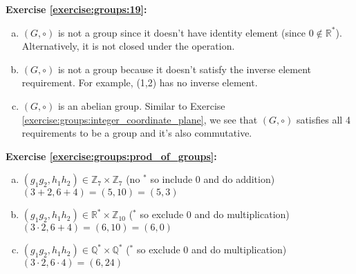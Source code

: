 \noindent\textbf{Exercise \ref{exercise:groups:19}:}
\begin{enumerate}[(a)]
\item
$(G, \circ)$ is not a group since it doesn't have identity element (since $ 0 \notin {\mathbb R}^*$). Alternatively, it is not closed under the operation.

\item
$(G, \circ)$ is not a group because it doesn't satisfy the inverse element requirement. For example, (1,2) has no inverse element.

\item
$(G, \circ)$ is an abelian group. Similar to Exercise \ref{exercise:groups:integer_coordinate_plane}, we see that $(G, \circ)$ satisfies all 4 requirements to be a group and it's also commutative.
\end{enumerate}

\noindent\textbf{Exercise \ref{exercise:groups:prod_of_groups}:}
\begin{enumerate}[(a)]
\item
$(g_1 g_2, h_1 h_2) \in {\mathbb Z}_7 \times {\mathbb Z}_7$ (no $^\ast$ so include 0 and do addition) \\
$(3 + 2, 6 + 4) = (5, 10) = (5, 3)$

\item
$(g_1 g_2, h_1 h_2) \in {\mathbb R}^{\ast} \times {\mathbb Z_{10}}$ ($^\ast$ so exclude 0 and do multiplication) \\
$(3 \cdot 2, 6 + 4) = (6, 10) = (6, 0)$

\item 
$(g_1 g_2, h_1 h_2) \in {\mathbb Q}^{\ast} \times {\mathbb Q}^{\ast}$ ($^\ast$ so exclude 0 and do multiplication) \\
$(3 \cdot 2, 6 \cdot 4) = (6, 24)$
\end{enumerate}


